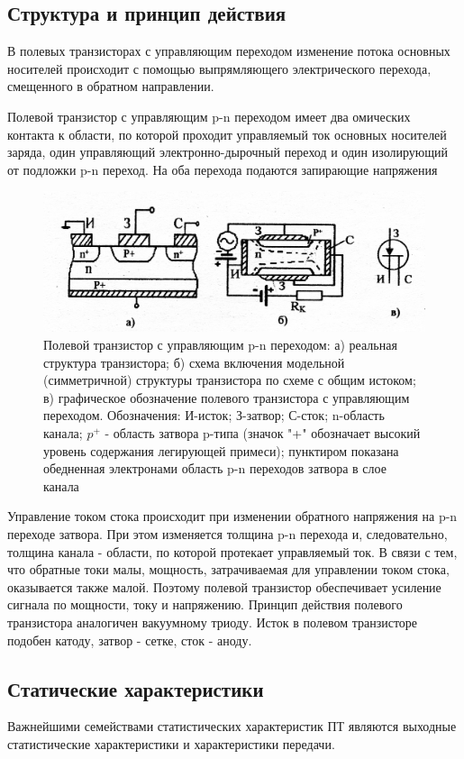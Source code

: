 \subsection{Структура и принцип действия}
В полевых транзисторах с управляющим переходом изменение потока основных носителей происходит с помощью выпрямляющего электрического перехода, смещенного в обратном направлении.

Полевой транзистор с управляющим p-n переходом имеет два омических контакта к области, по которой проходит управляемый ток основных носителей заряда, один управляющий электронно-дырочный переход и один изолирующий от подложки p-n переход. На оба перехода подаются запирающие напряжения
\begin{figure}[h!]
	\centering
	\includegraphics[width=0.5\linewidth]{imgs/fig2.jpg}
	\caption{Полевой транзистор с управляющим p-n переходом: а) реальная структура транзистора; б) схема включения модельной (симметричной) структуры транзистора по схеме с общим истоком; в) графическое обозначение полевого транзистора с управляющим переходом. Обозначения: И-исток; З-затвор; С-сток; n-область канала; $p^+$ - область затвора p-типа (значок "+" обозначает высокий уровень содержания легирующей примеси); пунктиром показана обедненная электронами область p-n переходов затвора в слое канала}
	\label{fig:2}
\end{figure}

Управление током стока происходит при изменении обратного напряжения на p-n переходе затвора. При этом изменяется толщина p-n перехода и, следовательно, толщина канала - области, по которой протекает управляемый ток. В связи с тем, что обратные токи малы, мощность, затрачиваемая для управлении током стока, оказывается также малой. Поэтому полевой транзистор обеспечивает усиление сигнала по мощности, току и напряжению. Принцип действия полевого транзистора аналогичен вакуумному триоду. Исток в полевом транзисторе подобен катоду, затвор - сетке, сток - аноду.

\subsection{Статические характеристики}
Важнейшими семействами статистических характеристик ПТ являются выходные статистические характеристики и характеристики передачи.

